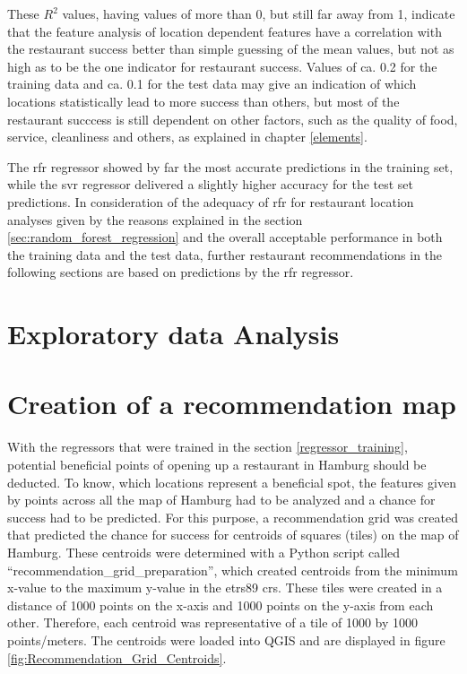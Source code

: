 \documentclass[a4paper, 11pt, oneside]{Thesis}  %
\begin{document}
These $R^2$ values, having values of more than 0, but still far away from 1, indicate that the feature analysis of location dependent features have a correlation with the restaurant success better than simple guessing of the mean values, but not as high as to be the one indicator for restaurant success. Values of ca. 0.2 for the training data and ca. 0.1 for the test data may give an indication of which locations statistically lead to more success than others, but most of the restaurant succcess is still dependent on other factors, such as the quality of food, service, cleanliness and others, as explained in chapter \ref{elements}.

The \ac{rfr} regressor showed by far the most accurate predictions in the training set, while the \ac{svr} regressor delivered a slightly higher accuracy for the test set predictions. In consideration of the adequacy of \ac{rfr} for restaurant location analyses given by the reasons explained in the section \ref{sec:random_forest_regression} and the overall acceptable performance in both the training data and the test data, further restaurant recommendations in the following sections are based on predictions by the \ac{rfr} regressor.

\section{Exploratory data Analysis}

\section{Creation of a recommendation map}

With the regressors that were trained in the section \ref{regressor_training}, potential beneficial points of opening up a restaurant in Hamburg should be deducted. To know, which locations represent a beneficial spot, the features given by points across all the map of Hamburg had to be analyzed and a chance for success had to be predicted. For this purpose, a recommendation grid was created that predicted the chance for success for centroids of squares (tiles) on the map of Hamburg. These centroids were determined with a Python script called ``recommendation\_grid\_preparation'', which created centroids from the minimum x-value to the maximum y-value in the \ac{etrs89} \ac{crs}. These tiles were created in a distance of 1000 points on the x-axis and 1000 points on the y-axis from each other. Therefore, each centroid was representative of a tile of 1000 by 1000 points/meters. The centroids were loaded into QGIS and are displayed in figure \ref{fig:Recommendation_Grid_Centroids}.
\end{document}
